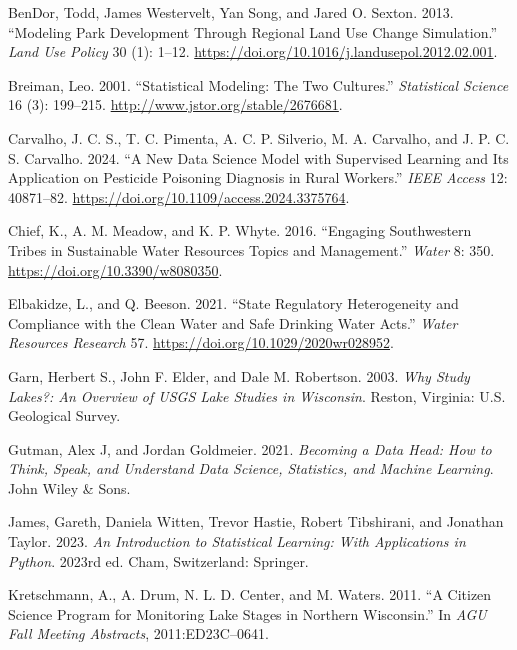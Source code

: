 \documentclass[
]{article}
\newlength{\cslhangindent}
\newenvironment{CSLReferences}[2] %
 {\begin{list}{}{%
  \setlength{\itemindent}{0pt}
  \setlength{\leftmargin}{0pt}
  \setlength{\parsep}{0pt}
  \ifodd #1
   \setlength{\leftmargin}{\cslhangindent}
   \setlength{\itemindent}{-1\cslhangindent}
  \fi
  \setlength{\itemsep}{#2\baselineskip}}}
 {\end{list}}
\begin{document}
\label{refs}
\begin{CSLReferences}{1}{0}
BenDor, Todd, James Westervelt, Yan Song, and Jared O. Sexton. 2013.
{``Modeling Park Development Through Regional Land Use Change
Simulation.''} \emph{Land Use Policy} 30 (1): 1--12.
\url{https://doi.org/10.1016/j.landusepol.2012.02.001}.

Breiman, Leo. 2001. {``Statistical Modeling: The Two Cultures.''}
\emph{Statistical Science} 16 (3): 199--215.
\url{http://www.jstor.org/stable/2676681}.

Carvalho, J. C. S., T. C. Pimenta, A. C. P. Silverio, M. A. Carvalho,
and J. P. C. S. Carvalho. 2024. {``A New Data Science Model with
Supervised Learning and Its Application on Pesticide Poisoning Diagnosis
in Rural Workers.''} \emph{IEEE Access} 12: 40871--82.
\url{https://doi.org/10.1109/access.2024.3375764}.

Chief, K., A. M. Meadow, and K. P. Whyte. 2016. {``Engaging Southwestern
Tribes in Sustainable Water Resources Topics and Management.''}
\emph{Water} 8: 350. \url{https://doi.org/10.3390/w8080350}.

Elbakidze, L., and Q. Beeson. 2021. {``State Regulatory Heterogeneity
and Compliance with the Clean Water and Safe Drinking Water Acts.''}
\emph{Water Resources Research} 57.
\url{https://doi.org/10.1029/2020wr028952}.

Garn, Herbert S., John F. Elder, and Dale M. Robertson. 2003. \emph{Why
Study Lakes?: An Overview of USGS Lake Studies in Wisconsin}. Reston,
Virginia: U.S. Geological Survey.

Gutman, Alex J, and Jordan Goldmeier. 2021. \emph{Becoming a Data Head:
How to Think, Speak, and Understand Data Science, Statistics, and
Machine Learning}. John Wiley \& Sons.

James, Gareth, Daniela Witten, Trevor Hastie, Robert Tibshirani, and
Jonathan Taylor. 2023. \emph{An Introduction to Statistical Learning:
With Applications in Python}. 2023rd ed. Cham, Switzerland: Springer.

Kretschmann, A., A. Drum, N. L. D. Center, and M. Waters. 2011. {``A
Citizen Science Program for Monitoring Lake Stages in Northern
Wisconsin.''} In \emph{AGU Fall Meeting Abstracts}, 2011:ED23C--0641.


\end{CSLReferences}
\end{document}
